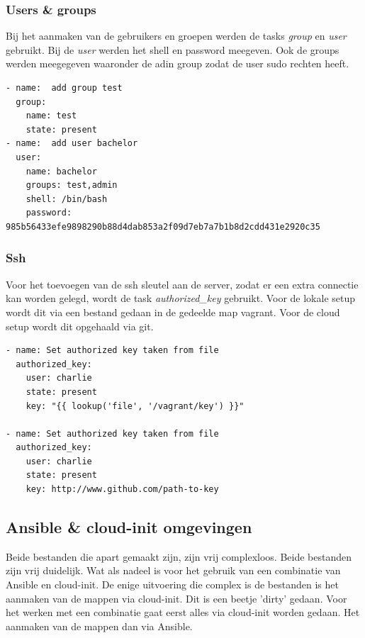 \subsubsection{Users \& groups}
Bij het aanmaken van de gebruikers en groepen werden de tasks \textit{group} en \textit{user} gebruikt. Bij de \textit{user} werden het shell en password meegeven. Ook de groups werden meegegeven waaronder de adin group zodat de user sudo rechten heeft.
\begin{lstlisting}
- name:  add group test
  group:
    name: test
    state: present
- name:  add user bachelor
  user:
    name: bachelor
    groups: test,admin
    shell: /bin/bash
    password: 985b56433efe9898290b88d4dab853a2f09d7eb7a7b1b8d2cdd431e2920c35
\end{lstlisting}

\subsubsection{Ssh}
Voor het toevoegen van de ssh sleutel aan de server, zodat er een extra connectie kan worden gelegd, wordt de task \textit{authorized\_key} gebruikt. Voor de lokale setup wordt dit via een bestand gedaan in de gedeelde map vagrant. Voor de cloud setup wordt dit opgehaald via git.
\begin{lstlisting}
- name: Set authorized key taken from file
  authorized_key:
	user: charlie
	state: present
	key: "{{ lookup('file', '/vagrant/key') }}"
	
- name: Set authorized key taken from file
  authorized_key:
	user: charlie
	state: present
	key: http://www.github.com/path-to-key
\end{lstlisting}

\subsection{Ansible \& cloud-init omgevingen}
Beide bestanden die apart gemaakt zijn, zijn vrij complexloos. Beide bestanden zijn vrij duidelijk. Wat als nadeel is voor het gebruik van een combinatie van Ansible en cloud-init. De enige uitvoering die complex is de bestanden is het aanmaken van de mappen via cloud-init. Dit is een beetje 'dirty' gedaan. Voor het werken met een combinatie gaat eerst alles via cloud-init worden gedaan. Het aanmaken van de mappen dan via Ansible.

